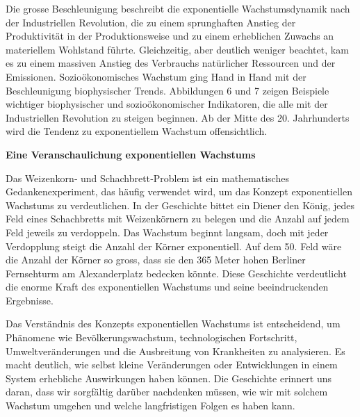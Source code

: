 \documentclass[
  letterpaper,
  DIV=11,
  numbers=noendperiod]{scrartcl}
\begin{document}
Die grosse Beschleunigung beschreibt die exponentielle Wachstumsdynamik
nach der Industriellen Revolution, die zu einem sprunghaften Anstieg der
Produktivität in der Produktionsweise und zu einem erheblichen Zuwachs
an materiellem Wohlstand führte. Gleichzeitig, aber deutlich weniger
beachtet, kam es zu einem massiven Anstieg des Verbrauchs natürlicher
Ressourcen und der Emissionen. Sozioökonomisches Wachstum ging Hand in
Hand mit der Beschleunigung biophysischer Trends. Abbildungen 6 und 7
zeigen Beispiele wichtiger biophysischer und sozioökonomischer
Indikatoren, die alle mit der Industriellen Revolution zu steigen
beginnen. Ab der Mitte des 20. Jahrhunderts wird die Tendenz zu
exponentiellem Wachstum offensichtlich.

\begin{tcolorbox}[enhanced jigsaw, breakable, left=2mm, colback=white, leftrule=.75mm, opacityback=0, bottomrule=.15mm, toprule=.15mm, arc=.35mm, rightrule=.15mm, colframe=quarto-callout-tip-color-frame]

\vspace{-3mm}\textbf{Eine Veranschaulichung exponentiellen Wachstums}\vspace{3mm}

Das Weizenkorn‑ und Schachbrett‑Problem ist ein mathematisches
Gedankenexperiment, das häufig verwendet wird, um das Konzept
exponentiellen Wachstums zu verdeutlichen. In der Geschichte bittet ein
Diener den König, jedes Feld eines Schachbretts mit Weizenkörnern zu
belegen und die Anzahl auf jedem Feld jeweils zu verdoppeln. Das
Wachstum beginnt langsam, doch mit jeder Verdopplung steigt die Anzahl
der Körner exponentiell. Auf dem 50. Feld wäre die Anzahl der Körner so
gross, dass sie den 365 Meter hohen Berliner Fernsehturm am
Alexanderplatz bedecken könnte. Diese Geschichte verdeutlicht die enorme
Kraft des exponentiellen Wachstums und seine beeindruckenden Ergebnisse.

Das Verständnis des Konzepts exponentiellen Wachstums ist entscheidend,
um Phänomene wie Bevölkerungswachstum, technologischen Fortschritt,
Umweltveränderungen und die Ausbreitung von Krankheiten zu analysieren.
Es macht deutlich, wie selbst kleine Veränderungen oder Entwicklungen in
einem System erhebliche Auswirkungen haben können. Die Geschichte
erinnert uns daran, dass wir sorgfältig darüber nachdenken müssen, wie
wir mit solchem Wachstum umgehen und welche langfristigen Folgen es
haben kann.

\end{tcolorbox}
\end{document}
